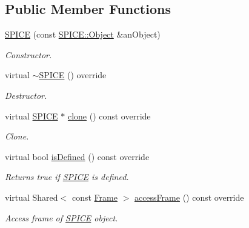 \subsection*{Public Member Functions}
\begin{DoxyCompactItemize}
\item 
\hyperlink{classlibrary_1_1physics_1_1env_1_1ephem_1_1_s_p_i_c_e_a736d504ac455e1c1ccadd03f11611e4b}{S\+P\+I\+CE} (const \hyperlink{classlibrary_1_1physics_1_1env_1_1ephem_1_1_s_p_i_c_e_a86f1a863677210ba8884807cc725c0f8}{S\+P\+I\+C\+E\+::\+Object} \&an\+Object)
\begin{DoxyCompactList}\small\item\em Constructor. \end{DoxyCompactList}\item 
virtual \hyperlink{classlibrary_1_1physics_1_1env_1_1ephem_1_1_s_p_i_c_e_ae6f089a215f400957d5cad057997d007}{$\sim$\+S\+P\+I\+CE} () override
\begin{DoxyCompactList}\small\item\em Destructor. \end{DoxyCompactList}\item 
virtual \hyperlink{classlibrary_1_1physics_1_1env_1_1ephem_1_1_s_p_i_c_e}{S\+P\+I\+CE} $\ast$ \hyperlink{classlibrary_1_1physics_1_1env_1_1ephem_1_1_s_p_i_c_e_a7d397f5472ec2e14d85fa493cb7c9ae0}{clone} () const override
\begin{DoxyCompactList}\small\item\em Clone. \end{DoxyCompactList}\item 
virtual bool \hyperlink{classlibrary_1_1physics_1_1env_1_1ephem_1_1_s_p_i_c_e_a54fb3fb8768a72f515231dac083eb9cb}{is\+Defined} () const override
\begin{DoxyCompactList}\small\item\em Returns true if \hyperlink{classlibrary_1_1physics_1_1env_1_1ephem_1_1_s_p_i_c_e}{S\+P\+I\+CE} is defined. \end{DoxyCompactList}\item 
virtual Shared$<$ const \hyperlink{classlibrary_1_1physics_1_1coord_1_1_frame}{Frame} $>$ \hyperlink{classlibrary_1_1physics_1_1env_1_1ephem_1_1_s_p_i_c_e_a20b94d4f05b17a2eb3ba986464da44a8}{access\+Frame} () const override
\begin{DoxyCompactList}\small\item\em Access frame of \hyperlink{classlibrary_1_1physics_1_1env_1_1ephem_1_1_s_p_i_c_e}{S\+P\+I\+CE} object. \end{DoxyCompactList}\end{DoxyCompactItemize}
